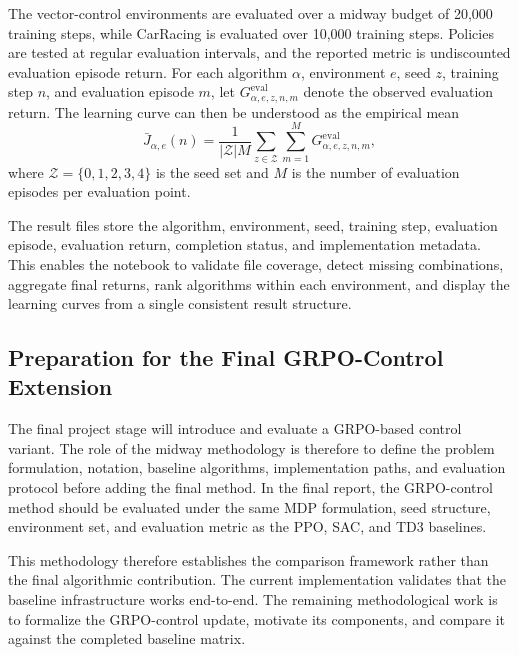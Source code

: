 The vector-control environments are evaluated over a midway budget of 20,000 training steps, while CarRacing is evaluated over 10,000 training steps. Policies are tested at regular evaluation intervals, and the reported metric is undiscounted evaluation episode return. For each algorithm $\alpha$, environment $e$, seed $z$, training step $n$, and evaluation episode $m$, let
$G^{\mathrm{eval}}_{\alpha,e,z,n,m}$ denote the observed evaluation return. The learning curve can then be understood as the empirical mean
\[
\bar{J}_{\alpha,e}(n)
=
\frac{1}{|\mathcal{Z}|M}
\sum_{z \in \mathcal{Z}}
\sum_{m=1}^{M}
G^{\mathrm{eval}}_{\alpha,e,z,n,m},
\]
where $\mathcal{Z}=\{0,1,2,3,4\}$ is the seed set and $M$ is the number of evaluation episodes per evaluation point.

The result files store the algorithm, environment, seed, training step, evaluation episode, evaluation return, completion status, and implementation metadata. This enables the notebook to validate file coverage, detect missing combinations, aggregate final returns, rank algorithms within each environment, and display the learning curves from a single consistent result structure.

\subsection{Preparation for the Final GRPO-Control Extension}
\label{sec:methodology-grpo-preparation}

The final project stage will introduce and evaluate a GRPO-based control variant. The role of the midway methodology is therefore to define the problem formulation, notation, baseline algorithms, implementation paths, and evaluation protocol before adding the final method. In the final report, the GRPO-control method should be evaluated under the same MDP formulation, seed structure, environment set, and evaluation metric as the PPO, SAC, and TD3 baselines.

This methodology therefore establishes the comparison framework rather than the final algorithmic contribution. The current implementation validates that the baseline infrastructure works end-to-end. The remaining methodological work is to formalize the GRPO-control update, motivate its components, and compare it against the completed baseline matrix.